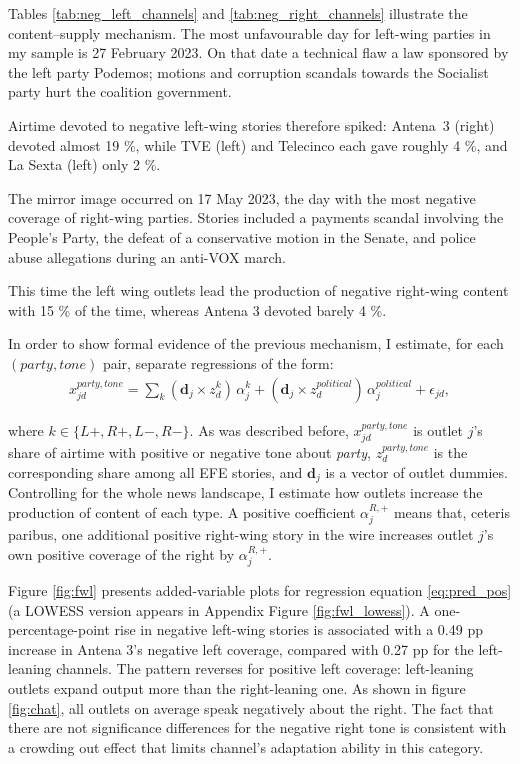 \documentclass[12pt]{article}
\begin{document}
	
	


	
Tables \ref{tab:neg_left_channels} and \ref{tab:neg_right_channels} illustrate the content–supply mechanism.  
The most unfavourable day for left-wing parties in my sample is 27 February 2023.  
On that date a technical flaw a law sponsored by the left party Podemos; motions and corruption scandals towards the Socialist party hurt the coalition government. 

Airtime devoted to negative left-wing stories therefore spiked: Antena~3 (right) devoted almost 19 \%, while TVE (left) and Telecinco each gave roughly 4 \%, and La Sexta (left) only 2 \%.

The mirror image occurred on 17 May 2023, the day with the most negative coverage of right-wing parties.  
Stories included a payments scandal involving the People's Party, the defeat of a conservative motion in the Senate, and police abuse allegations during an anti-VOX march.  

This time the left wing outlets lead the production of negative right-wing content with 15 \% of the time, whereas Antena 3 devoted barely 4 \%.


\medskip

In order to show formal evidence of the previous mechanism,  I estimate, for each $(party,tone)$ pair, separate regressions of the form:
\begin{equation}\label{eq:pred_pos}
	\begin{aligned}
		 x^{party, tone}_{jd} =	\sum_{k} 
		\left(\bm d_j \times z^{k}_d\right)\,\alpha_{j}^{k}
		+
		\left(\bm d_j \times z^{political}_d\right)\,\alpha_j^{political}
		+ \epsilon_{jd},
	\end{aligned}
\end{equation}

where $k \in\{L+,R+,L-,R-\}$. As was described before,  $x^{party, tone}_{jd}$ is outlet $j$’s share of airtime with positive or negative tone about \emph{party}, $z^{party, tone}_d$ is the corresponding share among all EFE stories, and $\bm d_j$ is a vector of outlet dummies.  Controlling for the whole news landscape, I estimate how outlets increase the production of content of each type. 
A positive coefficient $\alpha_{j}^{R,+}$ means that, ceteris paribus, one additional positive right-wing story in the wire increases outlet $j$’s own positive coverage of the right by $\alpha_{j}^{R,+}$.

Figure \ref{fig:fwl} presents added-variable plots for regression equation  \eqref{eq:pred_pos} (a LOWESS version appears in Appendix Figure \ref{fig:fwl_lowess}).  
A one-percentage-point rise in negative left-wing stories is associated with a 0.49 pp increase in Antena 3’s negative left coverage, compared with 0.27 pp for the left-leaning channels.  
The pattern reverses for positive left coverage: left-leaning outlets expand output more than the right-leaning one. As shown in figure \ref{fig:chat}, all outlets on average speak negatively about the right. The fact that there are not significance differences for the negative right tone is consistent with a crowding out effect that limits channel's adaptation ability in this category.
\end{document}
